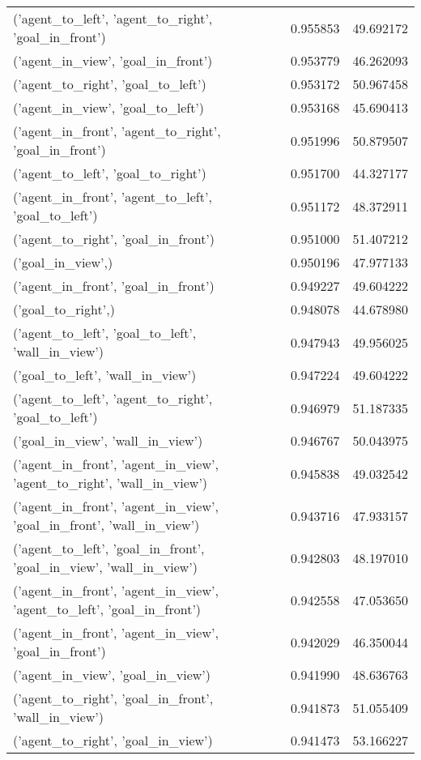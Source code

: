 \begin{tabular}{lrr}
('agent\_to\_left', 'agent\_to\_right', 'goal\_in\_front') & 0.955853 & 49.692172 \\
('agent\_in\_view', 'goal\_in\_front') & 0.953779 & 46.262093 \\
('agent\_to\_right', 'goal\_to\_left') & 0.953172 & 50.967458 \\
('agent\_in\_view', 'goal\_to\_left') & 0.953168 & 45.690413 \\
('agent\_in\_front', 'agent\_to\_right', 'goal\_in\_front') & 0.951996 & 50.879507 \\
('agent\_to\_left', 'goal\_to\_right') & 0.951700 & 44.327177 \\
('agent\_in\_front', 'agent\_to\_left', 'goal\_to\_left') & 0.951172 & 48.372911 \\
('agent\_to\_right', 'goal\_in\_front') & 0.951000 & 51.407212 \\
('goal\_in\_view',) & 0.950196 & 47.977133 \\
('agent\_in\_front', 'goal\_in\_front') & 0.949227 & 49.604222 \\
('goal\_to\_right',) & 0.948078 & 44.678980 \\
('agent\_to\_left', 'goal\_to\_left', 'wall\_in\_view') & 0.947943 & 49.956025 \\
('goal\_to\_left', 'wall\_in\_view') & 0.947224 & 49.604222 \\
('agent\_to\_left', 'agent\_to\_right', 'goal\_to\_left') & 0.946979 & 51.187335 \\
('goal\_in\_view', 'wall\_in\_view') & 0.946767 & 50.043975 \\
('agent\_in\_front', 'agent\_in\_view', 'agent\_to\_right', 'wall\_in\_view') & 0.945838 & 49.032542 \\
('agent\_in\_front', 'agent\_in\_view', 'goal\_in\_front', 'wall\_in\_view') & 0.943716 & 47.933157 \\
('agent\_to\_left', 'goal\_in\_front', 'goal\_in\_view', 'wall\_in\_view') & 0.942803 & 48.197010 \\
('agent\_in\_front', 'agent\_in\_view', 'agent\_to\_left', 'goal\_in\_front') & 0.942558 & 47.053650 \\
('agent\_in\_front', 'agent\_in\_view', 'goal\_in\_front') & 0.942029 & 46.350044 \\
('agent\_in\_view', 'goal\_in\_view') & 0.941990 & 48.636763 \\
('agent\_to\_right', 'goal\_in\_front', 'wall\_in\_view') & 0.941873 & 51.055409 \\
('agent\_to\_right', 'goal\_in\_view') & 0.941473 & 53.166227 \\

\end{tabular}
